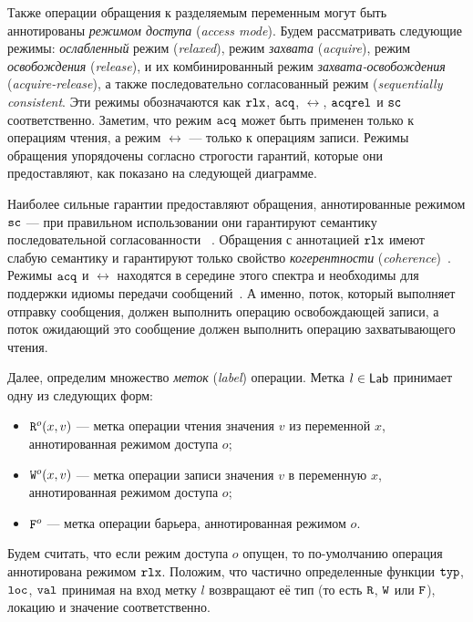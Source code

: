 Также операции обращения к разделяемым переменным 
могут быть аннотированы \emph{режимом доступа} (\emph{access mode}).
Будем рассматривать следующие режимы:
\emph{ослабленный} режим (\emph{relaxed}),
режим \emph{захвата} (\emph{acquire}), режим \emph{освобождения} (\emph{release}),
и их комбинированный режим \emph{захвата-освобождения} (\emph{acquire-release}),
а также последовательно согласованный режим (\emph{sequentially consistent}.
Эти режимы обозначаются как $\mathtt{rlx}$, ${\mathtt{acq}}$, $\rel$, ${\mathtt{acqrel}}$ и ${\mathtt{sc}}$ соответственно.
Заметим, что режим ${\mathtt{acq}}$ может быть применен только к операциям чтения,
а режим $\rel$ --- только к операциям записи.
Режимы обращения упорядочены согласно строгости гарантий, 
которые они предоставляют, как показано на следующей диаграмме. 



Наиболее сильные гарантии предоставляют обращения, 
аннотированные режимом ${\mathtt{sc}}$ --- 
при правильном использовании они гарантируют семантику 
последовательной согласованности%
~\cite{Manson-al:POPL05,Lahav-al:PLDI17}.
Обращения с аннотацией $\mathtt{rlx}$ имеют слабую семантику 
и гарантируют только свойство 
\emph{когерентности} (\emph{coherence})~\cite{Alglave-al:TOPLAS14}.
Режимы ${\mathtt{acq}}$ и $\rel$ находятся в середине этого спектра
и необходимы для поддержки идиомы передачи сообщений~\cite{Lahav-al:POPL16}.
А именно, поток, который выполняет отправку сообщения, 
должен выполнить операцию освобождающей записи, 
а поток ожидающий это сообщение должен выполнить операцию захватывающего чтения. 

Далее, определим множество \emph{меток} (\emph{label}) операции. 
Метка $l \in \mathsf{Lab}$ принимает одну из следующих форм:
\begin{itemize}
  \item ${{\mathtt{R}}}^{o}({x},{v})$ --- метка операции чтения значения $v$ из переменной $x$, 
    аннотированная режимом доступа $o$;
  \item ${{\mathtt{W}}}^{o}({x},{v})$ --- метка операции записи значения $v$ в переменную $x$, 
    аннотированная режимом доступа $o$;
  \item ${\mathtt{F}}^o$ --- метка операции барьера, аннотированная режимом $o$.
\end{itemize}
Будем считать, что если режим доступа $o$ опущен, 
то по-умолчанию операция аннотирована режимом $\mathtt{rlx}$.
Положим, что частично определенные функции ${\mathtt{typ}}$, ${\mathtt{loc}}$, ${\mathtt{val}}$
принимая на вход метку $l$ возвращают её тип (то есть ${\mathtt{R}}$, ${\mathtt{W}}$ или ${\mathtt{F}}$),
локацию и значение соответственно.

